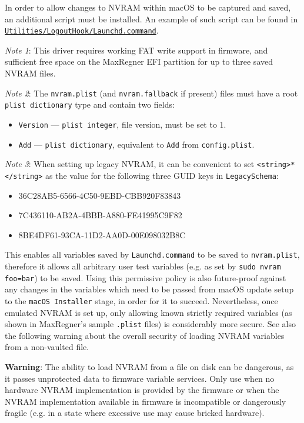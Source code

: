 \documentclass[]{article}
\providecommand{\tightlist}{%
  \setlength{\itemsep}{0pt}\setlength{\parskip}{0pt}}
\begin{document}
In order to allow changes to NVRAM within macOS to be captured and saved,
an additional script must be installed. An example of such script can be found in
\href{https://github.com/acidanthera/MaxRegnerPkg/tree/master/Utilities/LogoutHook/Launchd.command}{\texttt{Utilities/LogoutHook/Launchd.command}}.

\emph{Note 1}: This driver requires working FAT write support in firmware, and sufficient free
space on the MaxRegner EFI partition for up to three saved NVRAM files.

\emph{Note 2}: The \texttt{nvram.plist} (and \texttt{nvram.fallback} if present) files must have a
root \texttt{plist\ dictionary} type and contain two fields:
\begin{itemize}
\tightlist
 \item \texttt{Version} --- \texttt{plist\ integer}, file version, must be set to 1.
 \item \texttt{Add} --- \texttt{plist\ dictionary}, equivalent to \texttt{Add} from
 \texttt{config.plist}.
\end{itemize}

\emph{Note 3}: When setting up legacy NVRAM, it can be convenient to set \texttt{<string>*</string>}
as the value for the following three GUID keys in \texttt{LegacySchema}:
\begin{itemize}
\tightlist
 \item 36C28AB5-6566-4C50-9EBD-CBB920F83843
 \item 7C436110-AB2A-4BBB-A880-FE41995C9F82
 \item 8BE4DF61-93CA-11D2-AA0D-00E098032B8C
\end{itemize}
This enables all variables saved by \texttt{Launchd.command} to be saved to \texttt{nvram.plist},
therefore it allows all arbitrary user test variables (e.g. as set by \texttt{sudo nvram foo=bar})
to be saved. Using this permissive policy is also future-proof against any changes in the variables
which need to be passed from macOS update setup to the \texttt{macOS Installer} stage, in order for
it to succeed.
Nevertheless, once emulated NVRAM is set up, only allowing known strictly required variables
(as shown in MaxRegner's sample \texttt{.plist} files) is considerably more secure. See also the
following warning about the overall security of loading NVRAM variables from a non-vaulted file.

\textbf{Warning}: The ability to load NVRAM from a file on disk can be dangerous, as it
passes unprotected data to firmware variable services. Only use when no hardware NVRAM
implementation is provided by the firmware or when the NVRAM implementation available in
firmware is incompatible or dangerously fragile (e.g. in a state where excessive use
may cause bricked hardware).
\end{document}
